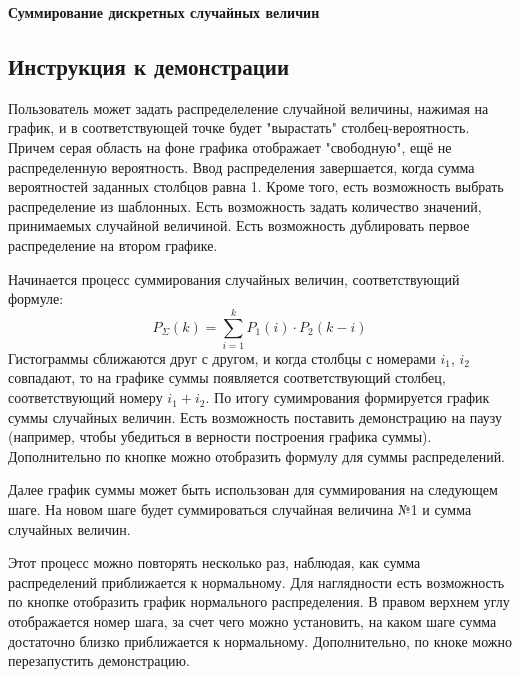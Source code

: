 \documentclass{article}
\begin{document}
\begin{center}
    \Huge{\textbf{Суммирование дискретных случайных величин \\[0.5in]}}
\end{center}



\begin{multicols}{2}
    \section{Инструкция к демонстрации}
    Пользователь может задать распределеление случайной величины, нажимая на график, и в соответствующей точке будет "вырастать" столбец-вероятность. Причем серая область на фоне графика отображает "свободную", ещё не распределенную вероятность. Ввод распределения завершается, когда сумма вероятностей заданных столбцов равна 1. Кроме того, есть возможность выбрать распределение из шаблонных. Есть возможность задать количество значений, принимаемых случайной величиной. Есть возможность дублировать первое распределение на втором графике. 

    Начинается процесс суммирования случайных величин, соответствующий формуле:
    \begin{equation}
        P_{\Sigma}(k) = \sum_{i=1}^{k}P_1(i) \cdot P_2(k-i)
    \end{equation}
    Гистограммы сближаются друг с другом, и когда столбцы с номерами $i_1$, $i_2$ совпадают, то на графике суммы появляется соответствующий столбец, соответствующий номеру $i_1 + i_2$. По итогу сумимрования формируется график суммы случайных величин. Есть возможность поставить демонстрацию на паузу (например, чтобы убедиться в верности построения графика суммы). Дополнительно по кнопке можно отобразить формулу для суммы распределений.

    Далее график суммы может быть использован для суммирования на следующем шаге. На новом шаге будет суммироваться случайная величина №1 и сумма случайных величин.

    Этот процесс можно повторять несколько раз, наблюдая, как сумма распределений приближается к нормальному.
    Для наглядности есть возможность по кнопке отобразить график нормального распределения. В правом верхнем углу  отображается номер шага, за счет чего можно установить, на каком шаге сумма достаточно близко приближается к нормальному. Дополнительно, по кноке можно перезапустить демонстрацию.
    

\end{multicols}
\end{document}

